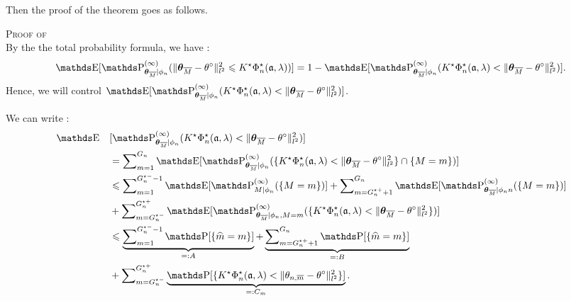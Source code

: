 Then the proof of the theorem goes as follows.
\begin{pro}{\textsc{Proof of } \\}\label{proB.2.3}
By the the total probability formula, we have :
\[ \E[\P_{\boldsymbol{\theta}_{\overline{M}}\vert \phi_{n}}^{(\infty)}(\Vert \boldsymbol{\theta}_{\overline{M}} - \theta^{\circ} \Vert_{l^{2}}^{2} \leq K^{\star} \Phi_{n}^{\star}(\mathfrak{a}, \lambda))] = 1 - \E[\P_{\boldsymbol{\theta}_{\overline{M}}\vert \phi_{n}}^{(\infty)}(K^{\star} \Phi_{n}^{\star}(\mathfrak{a}, \lambda) < \Vert \boldsymbol{\theta}_{\overline{M}} - \theta^{\circ} \Vert_{l^{2}}^{2})].\]
Hence, we will control $\E[\P_{\boldsymbol{\theta}_{\overline{M}}\vert \phi_{n}}^{(\infty)}(K^{\star} \Phi_{n}^{\star}(\mathfrak{a}, \lambda) < \Vert \boldsymbol{\theta}_{\overline{M}} - \theta^{\circ} \Vert_{l^{2}}^{2})]$.

We can write :
\begin{alignat*}{2}
& \E && [\P_{\boldsymbol{\theta}_{\overline{M}}\vert \phi_{n}}^{(\infty)}(K^{\star} \Phi_{n}^{\star}(\mathfrak{a}, \lambda) < \Vert \boldsymbol{\theta}_{\overline{M}} - \theta^{\circ} \Vert_{l^{2}}^{2})]\\
& && = \sum\nolimits_{m = 1}^{G_{n}} \E[\P_{\boldsymbol{\theta}_{\overline{M}} \vert \phi_{n}}^{(\infty)}(\{K^{\star} \Phi_{n}^{\star}(\mathfrak{a}, \lambda) < \Vert \boldsymbol{\theta}_{\overline{M}} - \theta^{\circ} \Vert_{l^{2}}^{2}\} \cap \{M = m\})]\\
& && \leq \sum\nolimits_{m = 1}^{G_{n}^{\star-} - 1} \E[\P_{M \vert \phi_{n}}^{(\infty)}(\{M = m\})] + \sum\nolimits_{m = G_{n}^{\star+} + 1}^{G_{n}} \E[\P_{\boldsymbol{\theta}_{\overline{M}} \vert \phi_{n}{n}}^{(\infty)}(\{M = m\})]\\
& && + \sum\nolimits_{m = G_{n}^{\star-}}^{G_{n}^{\star+}} \E[\P_{\boldsymbol{\theta}_{\overline{M}}\vert \phi_{n}, M = m}^{(\infty)}(\{K^{\star} \Phi_{n}^{\star}(\mathfrak{a}, \lambda) < \Vert \boldsymbol{\theta}_{\overline{M}} - \theta^{\circ} \Vert_{l^{2}}^{2}\})]\\
& && \leq \underbrace{\sum\nolimits_{m = 1}^{G_{n}^{\star-} - 1} \P[\{\widehat{m} = m\}]}_{=: A} + \underbrace{\sum\nolimits_{m = G_{n}^{\star+} + 1}^{G_{n}} \P[\{\widehat{m} = m\}]}_{=: B}\\
& && + \sum\nolimits_{m = G_{n}^{\star-}}^{G_{n}^{\star+}} \underbrace{\P[\{K^{\star} \Phi_{n}^{\star}(\mathfrak{a}, \lambda) < \Vert \theta_{n, \overline{m}} - \theta^{\circ} \Vert_{l^{2}}^{2}\}]}_{=: C_{m}}.
\end{alignat*}


\end{pro}
